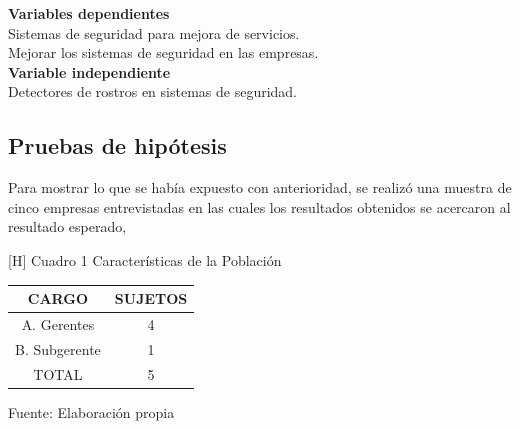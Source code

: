 \documentclass{comjnl}
\begin{document}
\textbf{Variables dependientes} \\
Sistemas de seguridad para mejora de servicios.\\
Mejorar los sistemas de seguridad en las empresas.\\
\textbf{Variable independiente}\\
Detectores de rostros en sistemas de seguridad.


\subsection{Pruebas de hipótesis}

Para mostrar lo que se había expuesto con anterioridad, se realizó una muestra de cinco empresas entrevistadas en las cuales los resultados obtenidos se acercaron al resultado esperado,
\begin{center} [H]
Cuadro 1
Características de la Población

\begin{tabular}{|c|c|}
	\hline 
	CARGO & SUJETOS \\ 
	\hline 
	A. Gerentes & 4 \\ 
	\hline 
	B. Subgerente  & 1 \\ 
	\hline 
	TOTAL & 5 \\ 
	\hline 
\end{tabular} 
 
Fuente: Elaboración propia
\end{center}
\newpage
\end{document}
